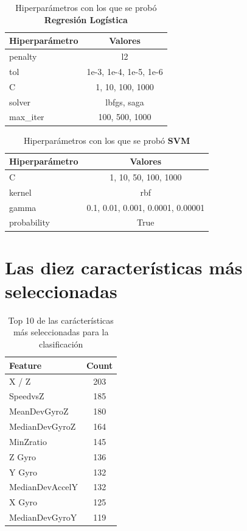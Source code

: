 \begin{appendices}
		

		\begin{table}[ht!]
			\centering
			\caption{Hiperparámetros con los que se probó \textbf{Regresión Logística}}
			\label{table:10}
			\begin{tabular}{lc}
				\toprule
				Hiperparámetro &                Valores \\
				\midrule
					   penalty &                     l2 \\
						   tol & 1e-3, 1e-4, 1e-5, 1e-6 \\
							 C &       1, 10, 100, 1000 \\
						solver &            lbfgs, saga \\
					  max\_iter &         100, 500, 1000 \\
				\bottomrule
			\end{tabular}
		\end{table}
		
		
		\begin{table}[htb]
			\centering
			\caption{Hiperparámetros con los que se probó \textbf{SVM}}
			\label{table:11}
			\begin{tabular}{lc}
			\toprule
			Hiperparámetro &                           Valores \\
			\midrule
						 C &              1, 10, 50, 100, 1000 \\
					kernel &                               rbf \\
					 gamma & 0.1, 0.01, 0.001, 0.0001, 0.00001 \\
			   probability &                              True \\
			\bottomrule
			\end{tabular}
		\end{table}
	

	\section*{Las diez características más seleccionadas}
	
	\begin{table}[htb]
		\centering
		\caption{Top 10 de las carácterísticas más seleccionadas para la clasificación}
		\label{table:12}
			\begin{tabular}{lc}
			\toprule
					Feature &  Count \\
			\midrule
					  X / Z &    203 \\
				   SpeedvsZ &    185 \\
			   MeanDevGyroZ &    180 \\
			 MedianDevGyroZ &    164 \\
				  MinZratio &    145 \\
					 Z Gyro &    136 \\
					 Y Gyro &    132 \\
			MedianDevAccelY &    132 \\
					 X Gyro &    125 \\
			 MedianDevGyroY &    119 \\
			\bottomrule
			\end{tabular}
	\end{table}
	

\end{appendices}
